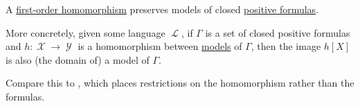 \begin{proposition}\label{thm:positive_formulas_preserved_under_homomorphism}
  A \hyperref[def:first_order_homomorphism]{first-order homomorphism} preserves models of closed \hyperref[def:positive_formula]{positive formulas}.

  More concretely, given some language \( \mscrL \), if \( \Gamma \) is a set of closed positive formulas and \( h: \mscrX \to \mscrY \) is a homomorphism between \hyperref[def:first_order_model]{models} of \( \Gamma \), then the image \( h[X] \) is also (the domain of) a model of \( \Gamma \).
\end{proposition}
\begin{comments}
  \item Compare this to , which places restrictions on the homomorphism rather than the formulas.
\end{comments}
